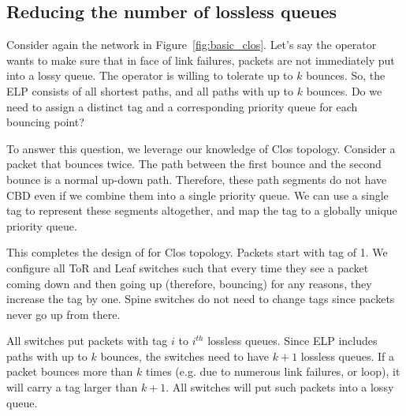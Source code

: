 \subsection{Reducing the number of lossless queues}
\label{subsec:combine}

Consider again the network in Figure~\ref{fig:basic_clos}.  Let's say the operator
wants to make sure that in face of link failures, packets are not immediately
put into a lossy queue. The operator is willing to tolerate up to $k$ bounces.
So, the ELP consists of all shortest paths, and all paths with up to $k$ bounces.
Do we need to assign a distinct tag and a corresponding priority queue for each
bouncing point?

To answer this question, we leverage our knowledge of Clos topology.  Consider a
packet that bounces twice. The path between the first bounce and the second
bounce is a normal up-down path. Therefore, these path segments do not have CBD
even if we combine them into a single priority queue. We can use a single tag to
represent these segments altogether, and map the tag to a globally unique
priority queue.

This completes the design of \sysname{} for Clos topology. Packets start with
tag of 1. We configure all ToR and Leaf switches such that every time they see
a packet coming down and then going up (therefore, bouncing) for any reasons,
they increase the tag by one. Spine switches do not need to change tags since
packets never go up from there.


All switches put packets with tag $i$ to $i^{th}$ lossless queues. Since ELP
includes paths with up to $k$ bounces, the switches need to have $k+1$ lossless
queues. If a packet bounces more than $k$ times (e.g. due to numerous link
failures, or loop), it will carry a tag larger than $k+1$. All switches will put
such packets into a lossy queue.

